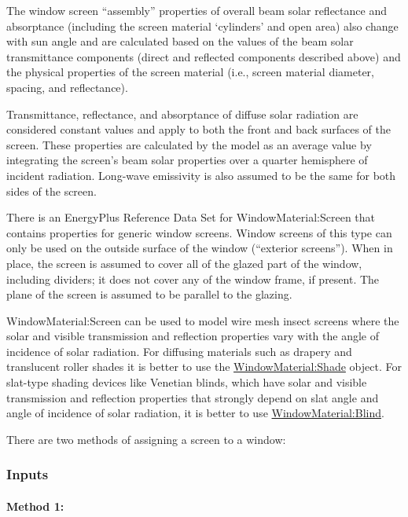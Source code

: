 The window screen ``assembly'' properties of overall beam solar reflectance and absorptance (including the screen material `cylinders' and open area) also change with sun angle and are calculated based on the values of the beam solar transmittance components (direct and reflected components described above) and the physical properties of the screen material (i.e., screen material diameter, spacing, and reflectance).

Transmittance, reflectance, and absorptance of diffuse solar radiation are considered constant values and apply to both the front and back surfaces of the screen. These properties are calculated by the model as an average value by integrating the screen's beam solar properties over a quarter hemisphere of incident radiation. Long-wave emissivity is also assumed to be the same for both sides of the screen.

There is an EnergyPlus Reference Data Set for WindowMaterial:Screen that contains properties for generic window screens. Window screens of this type can only be used on the outside surface of the window (``exterior screens''). When in place, the screen is assumed to cover all of the glazed part of the window, including dividers; it does not cover any of the window frame, if present. The plane of the screen is assumed to be parallel to the glazing.

WindowMaterial:Screen can be used to model wire mesh insect screens where the solar and visible transmission and reflection properties vary with the angle of incidence of solar radiation. For diffusing materials such as drapery and translucent roller shades it is better to use the \hyperref[windowmaterialshade]{WindowMaterial:Shade} object. For slat-type shading devices like Venetian blinds, which have solar and visible transmission and reflection properties that strongly depend on slat angle and angle of incidence of solar radiation, it is better to use \hyperref[windowmaterialblind]{WindowMaterial:Blind}.

There are two methods of assigning a screen to a window:

\subsubsection{Inputs}\label{inputs-25-003}

\paragraph{Method 1:}\label{method-1-2}

